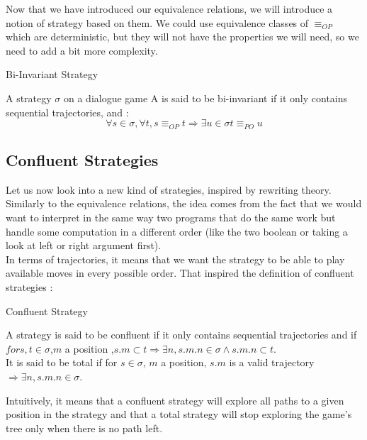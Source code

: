 \documentclass[a4paper,UKenglish]{lipics}
\begin{document}
Now that we have introduced our equivalence relations, we will introduce a notion of strategy based on them. We could use equivalence classes of $\equiv_{OP}$  which are deterministic, but they will not have the properties we will need, so we need to add a bit more complexity.


\begin{definition}{Bi-Invariant Strategy}

A strategy $\sigma$ on a dialogue game A is said to be bi-invariant if it only contains sequential trajectories, and : $$\forall s \in \sigma,\forall t, s \equiv_{OP} t \Rightarrow \exists u \in \sigma t \equiv_{PO} u$$
\end{definition}


\subsection{Confluent Strategies}
Let us now look into a new kind of strategies, inspired by rewriting theory. Similarly to the equivalence relations,  the idea comes from the fact that we would want to interpret in the same way two programs that do the same work but handle some computation in a different order (like the two boolean or taking a look at left or right argument first).\\ In terms of trajectories, it means that we want the strategy to be able to play available moves in every possible order. That inspired the definition of confluent strategies : 
\begin{definition}{Confluent Strategy}

A strategy is said to be confluent if it only contains sequential trajectories and if $for s,t \in \sigma$,$m$ a position ,$ s.m \subset t \Rightarrow \exists n, s.m.n \in \sigma \wedge s.m.n \subset t$.\\
It is said to be total if for $s \in \sigma$, $m$ a position, $s.m$ is a valid trajectory $\Rightarrow \exists n, s.m.n \in \sigma$.
\end{definition}
Intuitively, it means that a confluent strategy will explore all paths to a given position in the strategy and that a total strategy will stop exploring the game's tree only when there is no path left.\\
\end{document}
